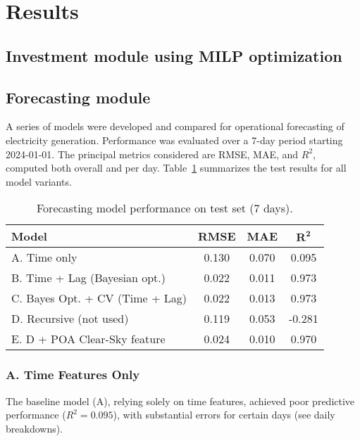 \newpage
\section{Results}

\subsection{Investment module using MILP optimization}





\subsection{Forecasting module}
A series of models were developed and compared for operational forecasting of electricity generation. 
Performance was evaluated over a 7-day period starting 2024-01-01. The principal metrics considered are RMSE, 
MAE, and $R^2$, computed both overall and per day. Table~\ref{tab:forecast-metrics} summarizes the test results 
for all model variants.

\begin{table}[h!]
    \centering
    \begin{tabular}{lccc}
        \textbf{Model} & \textbf{RMSE} & \textbf{MAE} & $\mathbf{R^2}$ \\
        \hline
        A. Time only & 0.130 & 0.070 & 0.095 \\
        B. Time + Lag (Bayesian opt.) & 0.022 & 0.011 & 0.973 \\
        C. Bayes Opt. + CV (Time + Lag) & 0.022 & 0.013 & 0.973 \\
        D. Recursive (not used) & 0.119 & 0.053 & -0.281 \\
        E. D + POA Clear-Sky feature & 0.024 & 0.010 & 0.970 \\
    \end{tabular}
    \caption{Forecasting model performance on test set (7 days).}
    \label{tab:forecast-metrics}
\end{table}

\subsubsection*{A. Time Features Only}
The baseline model (A), relying solely on time features, achieved poor predictive performance ($R^2=0.095$), 
with substantial errors for certain days (see daily breakdowns). 

